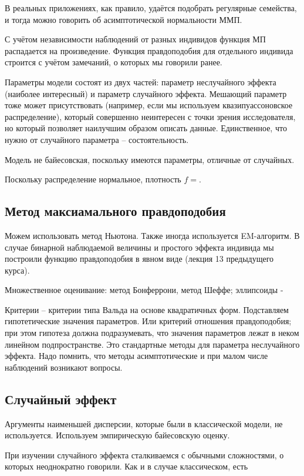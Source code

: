 \documentclass[main.tex]{subfiles}
\begin{document}
В реальных приложениях, как правило, удаётся подобрать регулярные семейства, и тогда можно говорить об асимптотической нормальности ММП.

С учётом независимости наблюдений от разных индивидов функция МП распадается на произведение.
Функция правдоподобия для отдельного индивида строится с учётом замечаний, о которых мы говорили ранее.

Параметры модели состоят из двух частей: параметр неслучайного эффекта (наиболее интересный) и параметр случайного эффекта.
Мешающий параметр тоже может присутствовать (например, если мы используем квазипуассоновское распределение), который совершенно неинтересен с точки зрения исследователя, но который позволяет наилучшим образом описать данные.
Единственное, что нужно от случайного параметра -- состоятельность.

Модель не байесовская, поскольку имеются параметры, отличные от случайных.

Поскольку распределение нормальное, плотность $f=$. %

\subsection{ Метод максиамального правдоподобия }

Можем использовать метод Ньютона.
Также иногда используется EM-алгоритм.
В случае бинарной наблюдаемой величины и простого эффекта индивида мы построили функцию правдоподобия в явном виде (лекция 13 предыдущего курса).

Множественное оценивание: метод Бонферрони, метод Шеффе; эллипсоиды - 

Критерии -- критерии типа Вальда на основе квадратичных форм.
Подставляем гипотетические значения параметров.
Или критерий отношения правдоподобия; при этом гипотеза должна подразумевать, что значения параметров лежат в неком линейном подпространстве.
Это стандартные методы для параметра неслучайного эффекта.
Надо помнить, что методы асимптотические и при малом числе наблюдений возникают вопросы.

\subsection{Случайный эффект}

Аргументы наименьшей дисперсии, которые были в классической модели, не используется.
Используем эмпирическую байесовскую оценку.

При изучении случайного эффекта сталкиваемся с обычными сложностями, о которых неоднократно говорили.
Как и в случае классическом, есть %
\end{document}
